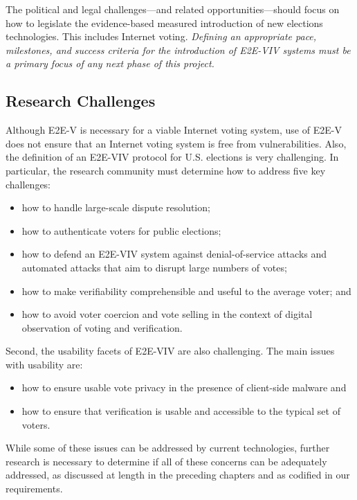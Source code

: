 The political and legal challenges---and related
opportunities---should focus on how to legislate the evidence-based
measured introduction of new elections technologies. This includes
Internet voting. \emph{Defining an appropriate pace, milestones, and
  success criteria for the introduction of E2E-VIV systems must be a
  primary focus of any next phase of this project.}

\subsection{Research Challenges}

Although E2E-V is necessary for a viable Internet voting system, use
of E2E-V does not ensure that an Internet voting system is free from
vulnerabilities. Also, the definition of an E2E-VIV protocol for
U.S. elections is very challenging. In particular, the research
community must determine how to address five key challenges:

\begin{itemize}
\item how to handle large-scale dispute resolution;
\item how to authenticate voters for public elections;
\item how to defend an E2E-VIV system against denial-of-service
  attacks and automated attacks that aim to disrupt large numbers of
  votes;
\item how to make verifiability comprehensible and useful to the
  average voter; and
\item how to avoid voter coercion and vote selling in the context of
  digital observation of voting and verification.
\end{itemize}

Second, the usability facets of E2E-VIV are also challenging. The main
issues with usability are:

\begin{itemize}
\item how to ensure usable vote privacy in the presence of client-side
  malware and
\item how to ensure that verification is usable and
  accessible to the typical set of voters.
\end{itemize}

While some of these issues can be addressed by current technologies,
further research is necessary to determine if all of these concerns
can be adequately addressed, as discussed at length in the preceding
chapters and as codified in our requirements.

